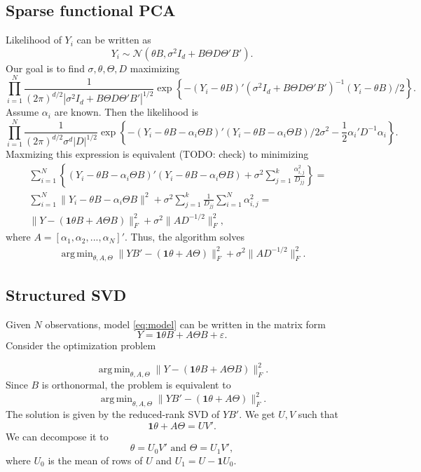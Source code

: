 \documentclass{article}
\newcommand{\cN}{\mathcal{N}}
\DeclareMathOperator*{\argmin}{arg\,min}
\begin{document}
\subsection{Sparse functional PCA}
Likelihood of $Y_i$ can be written as
\[
Y_i \sim \cN(\theta B, \sigma^2 I_d + B \Theta D \Theta' B').
\]
Our goal is to find $\sigma, \theta, \Theta, D$ maximizing
\[
\prod_{i=1}^N \frac{1}{(2\pi)^{d/2} |\sigma^2I_d + B \Theta D \Theta' B'|^{1/2}} \exp\left\{ -(Y_i - \theta B)'(\sigma^2 I_d + B \Theta D \Theta'B' )^{-1} (Y_i -  \theta B) / 2\right\}.
\]
Assume $\alpha_i$ are known. Then the likelihood is
\[
\prod_{i=1}^N \frac{1}{(2\pi)^{d/2} \sigma^d |D|^{1/2}} \exp\left\{ -(Y_i - \theta B - \alpha_i\Theta B)'(Y_i -  \theta B - \alpha_i\Theta B) / 2\sigma^2 - \frac{1}{2}\alpha_i' D^{-1} \alpha_i \right\}.
\]
Maxmizing this expression is equivalent (TODO: check) to minimizing
\begin{align*}
\sum_{i=1}^N \left\{ (Y_i - \theta B - \alpha_i\Theta B)'(Y_i -  \theta B - \alpha_i\Theta B) + \sigma^2 \sum_{j=1}^k \frac{\alpha_{i,j}^2}{D_{jj}}\right\} =&\\
\sum_{i=1}^N \| Y_i - \theta B - \alpha_i\Theta B\|^2 + \sigma^2 \sum_{j=1}^k \frac{1}{D_{jj}}\sum_{i=1}^N\alpha_{i,j}^2 =&\\
\| Y - (\mathbf{1}\theta B + A\Theta B)\|_F^2 + \sigma^2 \| A D^{-1/2} \|_F^2,
\end{align*}
where $A = [\alpha_1,\alpha_2,...,\alpha_N]'$.
Thus, the algorithm solves
\begin{align}\label{eq:optpca}
\argmin_{\theta,A,\Theta}\| Y B' - ( \mathbf{1}\theta + A\Theta)\|_F^2 + \sigma^2 \| A D^{-1/2} \|_F^2.
\end{align}

\subsection{Structured SVD}
Given $N$ observations, model \eqref{eq:model} can be written in the matrix form
\[
Y = \mathbf{1}\theta B + A \Theta B + \varepsilon.
\]
Consider the optimization problem
\usepackage{graphicx}
\[
\argmin_{\theta, A, \Theta} \| Y - (\mathbf{1}\theta B + A \Theta B)\|_F^2.
\]
Since $B$ is orthonormal, the problem is equivalent to 
\[
\argmin_{\theta, A, \Theta} \| YB' - (\mathbf{1}\theta + A \Theta)\|_F^2. 
\]
The solution is given by the reduced-rank SVD of $YB'$. We get $U,V$ such that
\[
\mathbf{1}\theta + A \Theta = UV'.
\]
We can decompose it to 
\[
\theta = U_0V' \text{ and } \Theta = U_1 V',
\]
where $U_0$ is the mean of rows of $U$ and $U_1 = U - \mathbf{1}U_0$.
\end{document}
